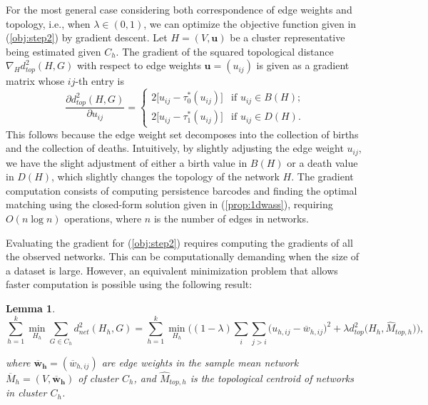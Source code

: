 \documentclass{article} %
\newtheorem{lemma}{Lemma}
\begin{document}
For the most general case considering both correspondence of edge weights and topology, i.e., when $\lambda \in (0,1)$, we can optimize the objective function given in (\ref{obj:step2}) by gradient descent.
Let $H=(V,\bm{u})$ be a cluster representative being estimated given $C_h$.
The gradient of the squared topological distance $\nabla_H d_{top}^2(H,G)$ with respect to edge weights $\bm{u} = (u_{ij})$  is given as a gradient matrix whose $ij$-th entry is 
\begin{equation}
\frac{\partial d^2_{top}(H,G)}{\partial u_{ij}} 
= 
\begin{cases}
2 \big[ u_{ij} - \tau_0^*( u_{ij}  ) \big] & \text{if } u_{ij} \in B(H); \\
2 \big[ u_{ij}  - \tau_1^*(u_{ij} ) \big] & \text{if } u_{ij} \in D(H).
\end{cases}
\end{equation}
This follows because the edge weight set decomposes into the collection of births and the collection of deaths. Intuitively, by slightly adjusting the edge weight $u_{ij}$, we have the slight adjustment of either a birth value in $B(H)$ or a death value in $D(H)$, which slightly changes the topology of the network $H$. 
The gradient computation consists of computing persistence barcodes and finding the optimal matching using the closed-form solution given in (\ref{prop:1dwass}), requiring $O(n\log n)$ operations, where $n$ is the number of edges in networks. 

Evaluating the gradient for (\ref{obj:step2}) requires computing the gradients of all the observed networks. This can be computationally demanding when the size of a dataset is large. However, an equivalent minimization problem that allows faster computation is possible using the following result:
\begin{lemma}
\begin{equation}
\sum_{h=1}^k \min_{H_h} \sum_{G \in C_h} d^2_{net}(H_h,G) = \sum_{h=1}^k \min_{H_h} \Big( (1-\lambda)\sum_{i}\sum_{j>i} \big(u_{h,ij} - \overline w_{h,ij} \big)^2 + \lambda d_{top}^2\big(H_h, \widehat M_{top,h}\big) \Big), 
\end{equation}

where $\bm{\overline w_h} = (\overline w_{h,ij})$ are edge weights in the sample mean network $\overline M_{h} = (V,\bm{\overline w_h})$ of cluster $C_h$, and $\widehat M_{top,h}$ is the topological centroid of networks in cluster $C_h$. 

\label{lemma:interpolation}
\end{lemma}
\end{document}
